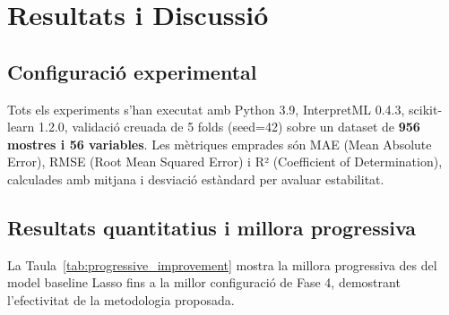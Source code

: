 
\section{Resultats i Discussió}
\label{sec:resultats}

\subsection{Configuració experimental}

Tots els experiments s'han executat amb Python 3.9, InterpretML 0.4.3, scikit-learn 1.2.0, validació creuada de 5 folds (seed=42) sobre un dataset de \textbf{956 mostres i 56 variables}. Les mètriques emprades són MAE (Mean Absolute Error), RMSE (Root Mean Squared Error) i R² (Coefficient of Determination), calculades amb mitjana i desviació estàndard per avaluar estabilitat.

\subsection{Resultats quantitatius i millora progressiva}

La Taula~\ref{tab:progressive_improvement} mostra la millora progressiva des del model baseline Lasso fins a la millor configuració de Fase 4, demostrant l'efectivitat de la metodologia proposada.

\begin{table}[htbp]
\centering
\caption{Evolució progressiva del rendiment del model a través de les fases de la metodologia.}
\label{tab:progressive_improvement}
\scriptsize
{}
\end{table}

